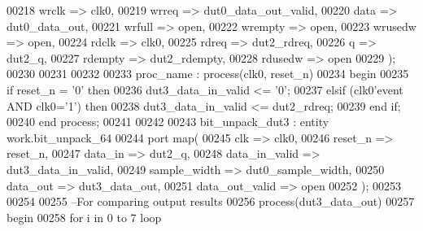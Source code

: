 \begin{DoxyCode}
00218       wrclk         => clk0,
00219       wrreq         => dut0_data_out_valid,
00220       data          => dut0_data_out,
00221       wrfull        => \textcolor{keywordflow}{open},
00222         wrempty       => \textcolor{keywordflow}{open},
00223       wrusedw       => \textcolor{keywordflow}{open},
00224       rdclk          => clk0,
00225       rdreq         => dut2_rdreq,
00226       q             => dut2_q,
00227       rdempty       => dut2_rdempty,
00228       rdusedw       => \textcolor{keywordflow}{open}          
00229         \textcolor{vhdlchar}{)};
00230         
00231         
00232         
00233 proc\_name : \textcolor{keywordflow}{process}(clk0, reset_n)
00234 \textcolor{vhdlkeyword}{begin}
00235    \textcolor{keywordflow}{if} \textcolor{vhdlchar}{reset_n} \textcolor{vhdlchar}{=} \textcolor{vhdlchar}{'}\textcolor{vhdllogic}{}\textcolor{vhdllogic}{0}\textcolor{vhdlchar}{'} \textcolor{keywordflow}{then} 
00236       \textcolor{vhdlchar}{dut3_data_in_valid} \textcolor{vhdlchar}{<=} \textcolor{vhdlchar}{'}\textcolor{vhdllogic}{}\textcolor{vhdllogic}{0}\textcolor{vhdlchar}{'};
00237    \textcolor{keywordflow}{elsif} \textcolor{vhdlchar}{(}\textcolor{vhdlchar}{clk0}\textcolor{vhdlchar}{'}\textcolor{vhdlkeyword}{event} \textcolor{keywordflow}{AND} \textcolor{vhdlchar}{clk0}\textcolor{vhdlchar}{=}\textcolor{vhdlchar}{'}\textcolor{vhdllogic}{}\textcolor{vhdllogic}{1}\textcolor{vhdlchar}{'}\textcolor{vhdlchar}{)} \textcolor{keywordflow}{then} 
00238       \textcolor{vhdlchar}{dut3_data_in_valid} \textcolor{vhdlchar}{<=} \textcolor{vhdlchar}{dut2_rdreq};
00239    \textcolor{keywordflow}{end} \textcolor{keywordflow}{if};
00240 \textcolor{keywordflow}{end} \textcolor{keywordflow}{process};
00241         
00242                
00243   bit\_unpack\_dut3 : \textcolor{keywordflow}{entity} work.bit_unpack_64 
00244 \textcolor{keywordflow}{port} \textcolor{keywordflow}{map}(
00245         clk             => clk0,
00246         reset_n         => reset_n,
00247         data_in         => dut2_q,
00248         data_in_valid   => dut3_data_in_valid,
00249         sample_width    => dut0_sample_width,
00250         data_out        => dut3_data_out,
00251         data_out_valid  => \textcolor{keywordflow}{open}
00252 \textcolor{vhdlchar}{)};
00253 
00254 
00255 \textcolor{keyword}{--For comparing output results}
00256 \textcolor{keywordflow}{process}(dut3_data_out)
00257 \textcolor{vhdlkeyword}{begin }
00258    \textcolor{keywordflow}{for} \textcolor{vhdlchar}{i} \textcolor{keywordflow}{in} \textcolor{vhdllogic}{}\textcolor{vhdllogic}{0} \textcolor{keywordflow}{to} \textcolor{vhdllogic}{}\textcolor{vhdllogic}{7} \textcolor{keywordflow}{loop}

\end{DoxyCode}
